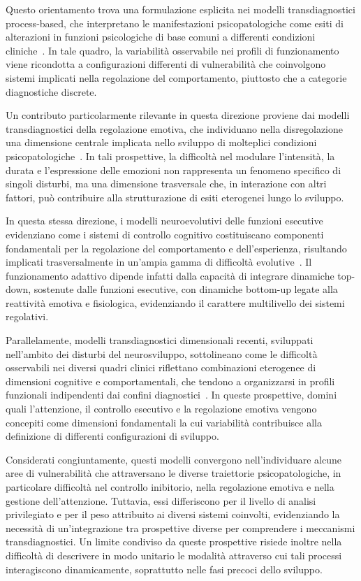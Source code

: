             Questo orientamento trova una formulazione esplicita nei modelli transdiagnostici process-based, che interpretano le manifestazioni psicopatologiche come esiti di alterazioni in funzioni psicologiche di base comuni a differenti condizioni cliniche~\cite{nolenhoeksema2011,dalgleish2020}. In tale quadro, la variabilità osservabile nei profili di funzionamento viene ricondotta a configurazioni differenti di vulnerabilità che coinvolgono sistemi implicati nella regolazione del comportamento, piuttosto che a categorie diagnostiche discrete.

            Un contributo particolarmente rilevante in questa direzione proviene dai modelli transdiagnostici della regolazione emotiva, che individuano nella disregolazione una dimensione centrale implicata nello sviluppo di molteplici condizioni psicopatologiche~\cite{beauchaine2015,beauchaine2019}. In tali prospettive, la difficoltà nel modulare l'intensità, la durata e l'espressione delle emozioni non rappresenta un fenomeno specifico di singoli disturbi, ma una dimensione trasversale che, in interazione con altri fattori, può contribuire alla strutturazione di esiti eterogenei lungo lo sviluppo.

            In questa stessa direzione, i modelli neuroevolutivi delle funzioni esecutive evidenziano come i sistemi di controllo cognitivo costituiscano componenti fondamentali per la regolazione del comportamento e dell'esperienza, risultando implicati trasversalmente in un'ampia gamma di difficoltà evolutive~\cite{zelazo2015,zelazo2020,diamond2013}. Il funzionamento adattivo dipende infatti dalla capacità di integrare dinamiche top-down, sostenute dalle funzioni esecutive, con dinamiche bottom-up legate alla reattività emotiva e fisiologica, evidenziando il carattere multilivello dei sistemi regolativi.

            Parallelamente, modelli transdiagnostici dimensionali recenti, sviluppati nell'ambito dei disturbi del neurosviluppo, sottolineano come le difficoltà osservabili nei diversi quadri clinici riflettano combinazioni eterogenee di dimensioni cognitive e comportamentali, che tendono a organizzarsi in profili funzionali indipendenti dai confini diagnostici~\cite{astle2022}. In queste prospettive, domini quali l'attenzione, il controllo esecutivo e la regolazione emotiva vengono concepiti come dimensioni fondamentali la cui variabilità contribuisce alla definizione di differenti configurazioni di sviluppo.

            Considerati congiuntamente, questi modelli convergono nell'individuare alcune aree di vulnerabilità che attraversano le diverse traiettorie psicopatologiche, in particolare difficoltà nel controllo inibitorio, nella regolazione emotiva e nella gestione dell'attenzione. Tuttavia, essi differiscono per il livello di analisi privilegiato e per il peso attribuito ai diversi sistemi coinvolti, evidenziando la necessità di un'integrazione tra prospettive diverse per comprendere i meccanismi transdiagnostici. Un limite condiviso da queste prospettive risiede inoltre nella difficoltà di descrivere in modo unitario le modalità attraverso cui tali processi interagiscono dinamicamente, soprattutto nelle fasi precoci dello sviluppo.

